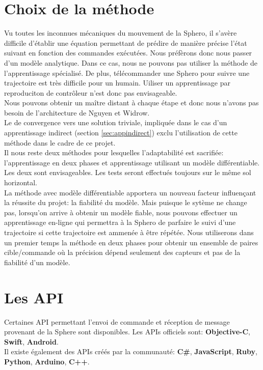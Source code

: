 \documentclass[12pt,a4paper,oneside, titlepage]{article}
\begin{document}
\section{Choix de la méthode}
Vu toutes les inconnues mécaniques du mouvement de la Sphero, il s'avère difficile d'établir une équation permettant de prédire de manière précise l'état suivant en fonction des commandes exécutées.
Nous préfèrons donc nous passer d'un modèle analytique.
Dans ce cas, nous ne pouvons pas utiliser la méthode de l'apprentissage spécialisé.
De plus, télécommander une Sphero pour suivre une trajectoire est très difficile pour un humain.
Uiliser un apprentissage par reproduciton de contrôleur n'est donc pas envisageable.\\
Nous pouvons obtenir un maître distant à chaque étape et donc nous n'avons pas besoin de l'architecture de Nguyen et Widrow.\\
Le de convergence vers une solution triviale, impliquée dans le cas d'un apprentissage indirect (section \ref{sec:appindirect}) exclu l'utilisation de cette méthode dans le cadre de ce projet.\\

Il nous reste deux méthodes pour lesquelles l'adaptabilité est sacrifiée: l'apprentissage en deux phases et apprentissage utilisant un modèle différentiable.
Les deux sont envisageables. Les tests seront effectués toujours sur le même sol horizontal.\\

La méthode avec modèle différentiable apportera un nouveau facteur influençant la réussite du projet: la fiabilité du modèle.
Mais puisque le sytème ne change pas, lorsqu'on arrive à obtenir un modèle fiable, nous pouvons effectuer un apprentissage en-ligne qui permettra à la Sphero de parfaire le suivi d'une trajectoire si cette trajectoire est ammenée à être répétée.
Nous utiliserons dans un premier temps la méthode en deux phases pour obtenir un ensemble de paires cible/commande où la précision dépend seulement des capteurs et pas de la fiabilité d'un modèle.

\section{Les API}
Certaines API permettant l'envoi de commande et réception de message provenant de la Sphere sont disponibles.
Les APIs officiels sont:\cite{SDKofficiels} \textbf{Objective-C}, \textbf{Swift}, \textbf{Android}.\\
Il existe également des APIs créés par la communauté:\cite{gosphero} \textbf{C\#}, \textbf{JavaScript}, \textbf{Ruby}, \textbf{Python}\cite{pythonAPI}, \textbf{Arduino}, \textbf{C++}\cite{cppAPI}.\\
\end{document}
